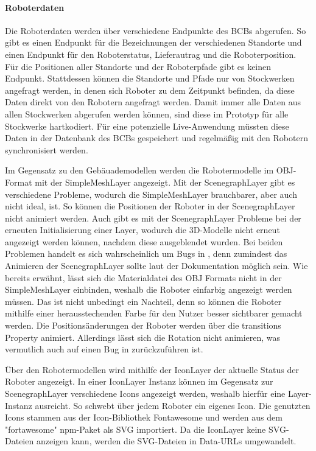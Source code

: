 \paragraph{Roboterdaten}
Die Roboterdaten werden über verschiedene Endpunkte des \ac{BCB}s abgerufen. So gibt es einen Endpunkt für die Bezeichnungen der verschiedenen Standorte und einen Endpunkt für den Roboterstatus, Lieferautrag und die Roboterposition.
Für die Positionen aller Standorte und der Roboterpfade gibt es keinen Endpunkt. Stattdessen können die Standorte und Pfade nur von Stockwerken angefragt werden, in denen sich Roboter zu dem Zeitpunkt befinden, da diese Daten direkt von den Robotern angefragt werden. Damit immer alle Daten aus allen Stockwerken abgerufen werden können, sind diese im Prototyp für alle Stockwerke hartkodiert. Für eine potenzielle Live-Anwendung müssten diese Daten in der Datenbank des \ac{BCB}s gespeichert und regelmäßig mit den Robotern synchronisiert werden.

Im Gegensatz zu den Gebäuademodellen werden die Robotermodelle im \ac{OBJ}-Format mit der SimpleMeshLayer angezeigt. Mit der ScenegraphLayer gibt es verschiedene Probleme, wodurch die SimpleMeshLayer brauchbarer, aber auch nicht ideal, ist. So können die Positionen der Roboter in der ScenegraphLayer nicht animiert werden. Auch gibt es mit der ScenegraphLayer Probleme bei der erneuten Initialisierung einer Layer, wodurch die 3D-Modelle nicht erneut angezeigt werden können, nachdem diese ausgeblendet wurden. Bei beiden Problemen handelt es sich wahrscheinlich um Bugs in \deckgl{}, denn zumindest das Animieren der ScenegraphLayer sollte laut der Dokumentation möglich sein. 
Wie bereits erwähnt, lässt sich die Materialdatei des \ac{OBJ} Formats nicht in der SimpleMeshLayer einbinden, weshalb die Roboter einfarbig angezeigt werden müssen. Das ist nicht unbedingt ein Nachteil, denn so können die Roboter mithilfe einer herausstechenden Farbe für den Nutzer besser sichtbarer gemacht werden. Die Positionsänderungen der Roboter werden über die transitions Property animiert. Allerdings lässt sich die Rotation nicht animieren, was vermutlich auch auf einen Bug in \deckgl{} zurückzuführen ist.

Über den Robotermodellen wird mithilfe der IconLayer der aktuelle Status der Roboter angezeigt. In einer IconLayer Instanz können im Gegensatz zur ScenegraphLayer verschiedene Icons angezeigt werden, weshalb hierfür eine Layer-Instanz ausreicht. 
So schwebt über jedem Roboter ein eigenes Icon. Die genutzten Icons stammen aus der Icon-Bibliothek Fontawesome und werden aus dem "fortawesome" npm-Paket als \ac{SVG} importiert.
Da die IconLayer keine \ac{SVG}-Dateien anzeigen kann, werden die SVG-Dateien in Data-URLs umgewandelt.

